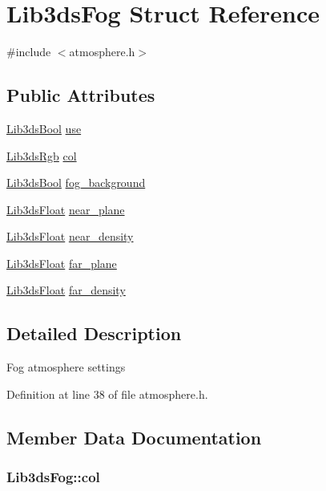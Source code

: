 \hypertarget{struct_lib3ds_fog}{\section{Lib3ds\-Fog Struct Reference}
\label{struct_lib3ds_fog}
}


{\ttfamily \#include $<$atmosphere.\-h$>$}

\subsection*{Public Attributes}
\begin{DoxyCompactItemize}
\item 
\hyperlink{types_8h_a89dd7398a9ebbbf28011f8c32df67ad3}{Lib3ds\-Bool} \hyperlink{struct_lib3ds_fog_acf9e0f4459111c8c232893cf244102ec}{use}
\item 
\hyperlink{types_8h_a7e320d64d2488320001f7f3b25168ee3}{Lib3ds\-Rgb} \hyperlink{struct_lib3ds_fog_abb71477b89583397eaaa13dec15366c7}{col}
\item 
\hyperlink{types_8h_a89dd7398a9ebbbf28011f8c32df67ad3}{Lib3ds\-Bool} \hyperlink{struct_lib3ds_fog_abe6dead99e5d6892a317f98715e41b53}{fog\-\_\-background}
\item 
\hyperlink{types_8h_ab18e70f51f9a53c9dee8d930c8e1a7bf}{Lib3ds\-Float} \hyperlink{struct_lib3ds_fog_a0a0f05b7d85f01efdb7b661dc939ae41}{near\-\_\-plane}
\item 
\hyperlink{types_8h_ab18e70f51f9a53c9dee8d930c8e1a7bf}{Lib3ds\-Float} \hyperlink{struct_lib3ds_fog_accdad3b95d54b1dc402286faa2e230a6}{near\-\_\-density}
\item 
\hyperlink{types_8h_ab18e70f51f9a53c9dee8d930c8e1a7bf}{Lib3ds\-Float} \hyperlink{struct_lib3ds_fog_a8965d29f652eb45b35c8bdddce2e5321}{far\-\_\-plane}
\item 
\hyperlink{types_8h_ab18e70f51f9a53c9dee8d930c8e1a7bf}{Lib3ds\-Float} \hyperlink{struct_lib3ds_fog_a579e22fd33c5602107c25f10bc6a5dda}{far\-\_\-density}
\end{DoxyCompactItemize}


\subsection{Detailed Description}
Fog atmosphere settings 

Definition at line 38 of file atmosphere.\-h.



\subsection{Member Data Documentation}
\hypertarget{struct_lib3ds_fog_abb71477b89583397eaaa13dec15366c7}{
\subsubsection[{col}]{ Lib3ds\-Fog\-::col}}\label{struct_lib3ds_fog_abb71477b89583397eaaa13dec15366c7}


